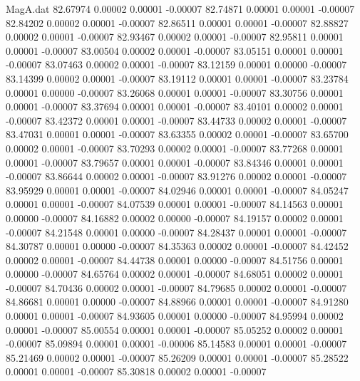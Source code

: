 \begin{filecontents}{MagA.dat}
  82.67974    0.00002    0.00001   -0.00007
  82.74871    0.00001    0.00001   -0.00007
  82.84202    0.00002    0.00001   -0.00007
  82.86511    0.00001    0.00001   -0.00007
  82.88827    0.00002    0.00001   -0.00007
  82.93467    0.00002    0.00001   -0.00007
  82.95811    0.00001    0.00001   -0.00007
  83.00504    0.00002    0.00001   -0.00007
  83.05151    0.00001    0.00001   -0.00007
  83.07463    0.00002    0.00001   -0.00007
  83.12159    0.00001    0.00000   -0.00007
  83.14399    0.00002    0.00001   -0.00007
  83.19112    0.00001    0.00001   -0.00007
  83.23784    0.00001    0.00000   -0.00007
  83.26068    0.00001    0.00001   -0.00007
  83.30756    0.00001    0.00001   -0.00007
  83.37694    0.00001    0.00001   -0.00007
  83.40101    0.00002    0.00001   -0.00007
  83.42372    0.00001    0.00001   -0.00007
  83.44733    0.00002    0.00001   -0.00007
  83.47031    0.00001    0.00001   -0.00007
  83.63355    0.00002    0.00001   -0.00007
  83.65700    0.00002    0.00001   -0.00007
  83.70293    0.00002    0.00001   -0.00007
  83.77268    0.00001    0.00001   -0.00007
  83.79657    0.00001    0.00001   -0.00007
  83.84346    0.00001    0.00001   -0.00007
  83.86644    0.00002    0.00001   -0.00007
  83.91276    0.00002    0.00001   -0.00007
  83.95929    0.00001    0.00001   -0.00007
  84.02946    0.00001    0.00001   -0.00007
  84.05247    0.00001    0.00001   -0.00007
  84.07539    0.00001    0.00001   -0.00007
  84.14563    0.00001    0.00000   -0.00007
  84.16882    0.00002    0.00000   -0.00007
  84.19157    0.00002    0.00001   -0.00007
  84.21548    0.00001    0.00000   -0.00007
  84.28437    0.00001    0.00001   -0.00007
  84.30787    0.00001    0.00000   -0.00007
  84.35363    0.00002    0.00001   -0.00007
  84.42452    0.00002    0.00001   -0.00007
  84.44738    0.00001    0.00000   -0.00007
  84.51756    0.00001    0.00000   -0.00007
  84.65764    0.00002    0.00001   -0.00007
  84.68051    0.00002    0.00001   -0.00007
  84.70436    0.00002    0.00001   -0.00007
  84.79685    0.00002    0.00001   -0.00007
  84.86681    0.00001    0.00000   -0.00007
  84.88966    0.00001    0.00001   -0.00007
  84.91280    0.00001    0.00001   -0.00007
  84.93605    0.00001    0.00000   -0.00007
  84.95994    0.00002    0.00001   -0.00007
  85.00554    0.00001    0.00001   -0.00007
  85.05252    0.00002    0.00001   -0.00007
  85.09894    0.00001    0.00001   -0.00006
  85.14583    0.00001    0.00001   -0.00007
  85.21469    0.00002    0.00001   -0.00007
  85.26209    0.00001    0.00001   -0.00007
  85.28522    0.00001    0.00001   -0.00007
  85.30818    0.00002    0.00001   -0.00007

\end{filecontents}
